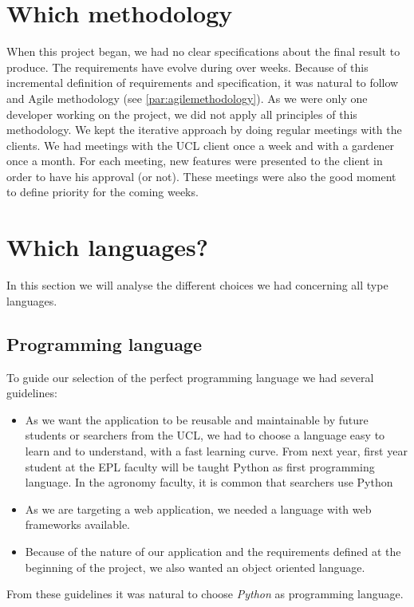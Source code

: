 \section{Which methodology}
When this project began, we had no clear specifications about the final result to produce. The requirements have evolve during over weeks. Because of this incremental definition of requirements and specification, it was natural to follow and Agile methodology (see \ref{par:agilemethodology}).
As we were only one developer working on the project, we did not apply all principles of this methodology. We kept the iterative approach by doing regular meetings with the clients. We had meetings with the UCL client once a week and with a gardener once a month.
For each meeting, new features were presented to the client in order to have his approval (or not). These meetings were also the good moment to define priority for the coming weeks.


\section{Which languages?}
In this section we will analyse the different choices we had concerning all type languages. 
\subsection{Programming language}
To guide our selection of the perfect programming language we had several guidelines:
\begin{itemize}
\item As we want the application to be reusable and maintainable by future students or searchers from the UCL, we had to choose a language easy to learn and to understand, with a fast learning curve. From next year, first year student at the EPL faculty will be taught Python as first programming language. In the agronomy faculty, it is common that searchers use Python 
\item As we are targeting a web application, we needed a language with web frameworks available.
\item Because of the nature of our application and the requirements defined at the beginning of the project, we also wanted an object oriented language.
\end{itemize}

From these guidelines it was natural to choose \emph{Python} as programming language.
